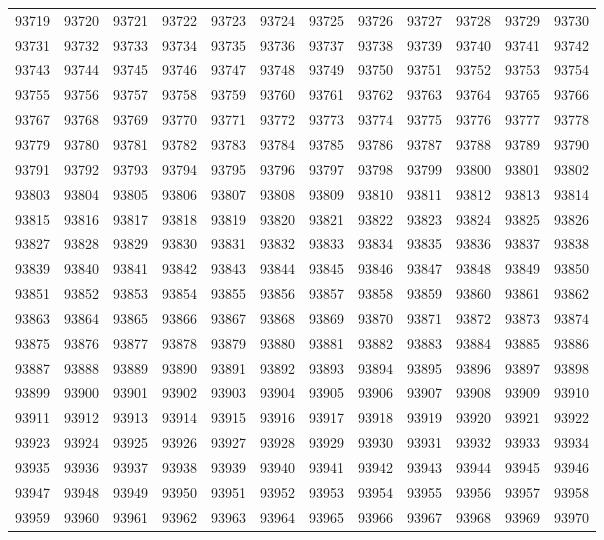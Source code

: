 \begin{center}
\begin{longtable}{llllllllllll}
93719 &93720 &93721 &93722 &93723 &93724 &93725 &93726 &93727 &93728 &93729 &93730 \\
93731 &93732 &93733 &93734 &93735 &93736 &93737 &93738 &93739 &93740 &93741 &93742 \\
93743 &93744 &93745 &93746 &93747 &93748 &93749 &93750 &93751 &93752 &93753 &93754 \\
93755 &93756 &93757 &93758 &93759 &93760 &93761 &93762 &93763 &93764 &93765 &93766 \\
93767 &93768 &93769 &93770 &93771 &93772 &93773 &93774 &93775 &93776 &93777 &93778 \\
93779 &93780 &93781 &93782 &93783 &93784 &93785 &93786 &93787 &93788 &93789 &93790 \\
93791 &93792 &93793 &93794 &93795 &93796 &93797 &93798 &93799 &93800 &93801 &93802 \\
93803 &93804 &93805 &93806 &93807 &93808 &93809 &93810 &93811 &93812 &93813 &93814 \\
93815 &93816 &93817 &93818 &93819 &93820 &93821 &93822 &93823 &93824 &93825 &93826 \\
93827 &93828 &93829 &93830 &93831 &93832 &93833 &93834 &93835 &93836 &93837 &93838 \\
93839 &93840 &93841 &93842 &93843 &93844 &93845 &93846 &93847 &93848 &93849 &93850 \\
93851 &93852 &93853 &93854 &93855 &93856 &93857 &93858 &93859 &93860 &93861 &93862 \\
93863 &93864 &93865 &93866 &93867 &93868 &93869 &93870 &93871 &93872 &93873 &93874 \\
93875 &93876 &93877 &93878 &93879 &93880 &93881 &93882 &93883 &93884 &93885 &93886 \\
93887 &93888 &93889 &93890 &93891 &93892 &93893 &93894 &93895 &93896 &93897 &93898 \\
93899 &93900 &93901 &93902 &93903 &93904 &93905 &93906 &93907 &93908 &93909 &93910 \\
93911 &93912 &93913 &93914 &93915 &93916 &93917 &93918 &93919 &93920 &93921 &93922 \\
93923 &93924 &93925 &93926 &93927 &93928 &93929 &93930 &93931 &93932 &93933 &93934 \\
93935 &93936 &93937 &93938 &93939 &93940 &93941 &93942 &93943 &93944 &93945 &93946 \\
93947 &93948 &93949 &93950 &93951 &93952 &93953 &93954 &93955 &93956 &93957 &93958 \\
93959 &93960 &93961 &93962 &93963 &93964 &93965 &93966 &93967 &93968 &93969 &93970 \\

\end{longtable}
\end{center}
